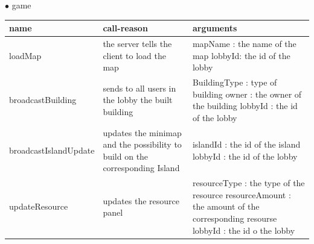 \documentclass{scrartcl}
\newcommand{\n}{\newline}
\begin{document}
$\bullet$ game
\begin{center}
    \begin{tabular}{| p{3.1cm} | p{5cm} | p{5.9cm} |}
        \hline
        \textbf{name} & \textbf{call-reason} & \textbf{arguments} \\ \hline
        loadMap & the server tells the client to load the map & mapName : the name of the map\n
        lobbyId: the id of the lobby \\ \hline
        broadcastBuilding & sends to all users in the lobby the built building & BuildingType : type of building\n
        owner : the owner of the building\n
        lobbyId : the id of the lobby \\ \hline
        broadcastIsland\n Update & updates the minimap and the possibility to build on the corresponding Island & islandId : the id of the island\n
        lobbyId : the id of the lobby \\ \hline
        updateResource & updates the resource panel & resourceType : the type of the resource \n
        resourceAmount : the amount of the corresponding resourse\n
        lobbyId : the id o the lobby \\ \hline
    \end{tabular}
\end{center}
\end{document}
